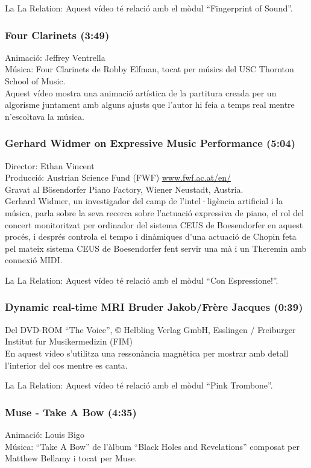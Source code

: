 La La Relation: Aquest vídeo té relació amb el mòdul ``Fingerprint of Sound''.

\subsubsection*{Four Clarinets (3:49)}
Animació: Jeffrey Ventrella \\
Música: Four Clarinets de Robby Elfman, tocat per músics del USC Thornton School of Music. \\

Aquest vídeo mostra una animació artística de la partitura creada per un algorisme juntament amb alguns ajusts que l'autor hi feia a temps real mentre n'escoltava la música.

\subsubsection*{Gerhard Widmer on Expressive Music Performance (5:04)}
Director: Ethan Vincent \\
Producció: Austrian Science Fund (FWF) \url{www.fwf.ac.at/en/} \\
Gravat al Bösendorfer Piano Factory, Wiener Neustadt, Austria. \\

Gerhard Widmer, un investigador del camp de l'intel·ligència artificial i la música, parla sobre la seva recerca sobre l'actuació expressiva de piano, el rol del concert monitoritzat per ordinador del sistema CEUS de Boesendorfer en aquest procés, i després controla el tempo i dinàmiques d'una actuació de Chopin feta pel mateix sistema CEUS de Boesendorfer fent servir una mà i un Theremin amb connexió MIDI.

La La Relation: Aquest vídeo té relació amb el mòdul ``Con Espressione!''.

\subsubsection*{Dynamic real-time MRI Bruder Jakob/Frère Jacques (0:39)}
Del DVD-ROM ``The Voice'', © Helbling Verlag GmbH, Esslingen / Freiburger Institut fur Musikermedizin (FIM)\\

En aquest vídeo s'utilitza una ressonància magnètica per mostrar amb detall l'interior del cos mentre es canta.

La La Relation: Aquest vídeo té relació amb el mòdul ``Pink Trombone''.

\subsubsection*{Muse - Take A Bow (4:35)}
Animació: Louis Bigo \\
Música: ``Take A Bow'' de l'àlbum ``Black Holes and Revelations'' composat per Matthew Bellamy i tocat per Muse. \\

